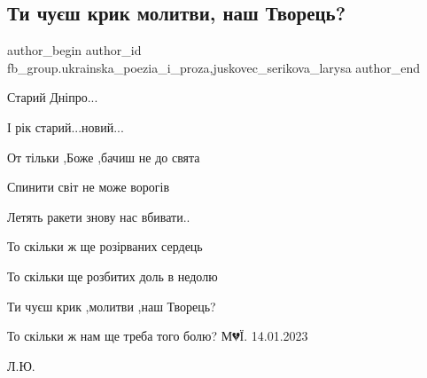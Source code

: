  
 
 
 
 

\subsection{Ти чуєш крик молитви, наш Творець?}
\label{sec:14_01_2023.fb.fb_group.ukrainska_poezia_i_proza.1.ti_chu_sh_krik_molit}
 
\ifcmt
 author_begin
   author_id fb_group.ukrainska_poezia_i_proza,juskovec_serikova_larysa
 author_end
\fi

Старий Дніпро...

І рік старий...новий...

От тільки ,Боже ,бачиш не до свята

Спинити світ не може ворогів

Летять ракети знову нас вбивати..

То скільки ж ще розірваних сердець 

То скільки ще розбитих доль в недолю

Ти чуєш крик ,молитви ,наш Творець?

То скільки ж нам ще треба того болю?
М💔Ї. 14.01.2023

Л.Ю.
